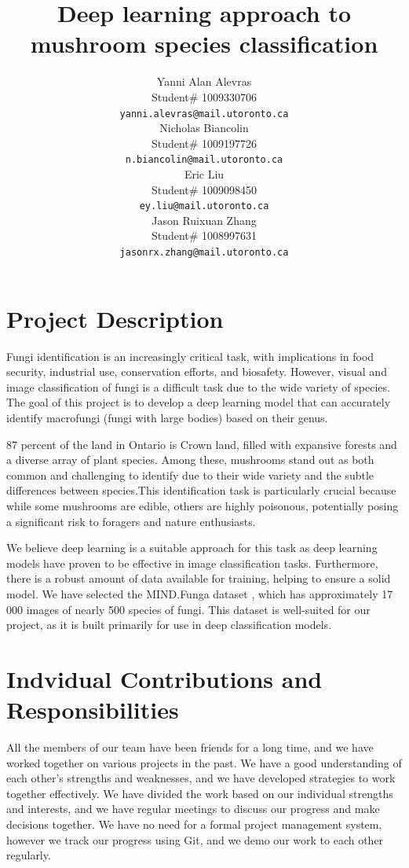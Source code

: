\documentclass{article} %
\title{Deep learning approach to  \\ 
mushroom species classification}
\author{Yanni Alan Alevras  \\
Student\# 1009330706 \\
\texttt{yanni.alevras@mail.utoronto.ca} \\
\And
Nicholas Biancolin  \\
Student\# 1009197726 \\
\texttt{n.biancolin@mail.utoronto.ca} \\
\AND
Eric Liu  \\
Student\# 1009098450 \\
\texttt{ey.liu@mail.utoronto.ca} \\
\And
Jason Ruixuan Zhang \\
Student\# 1008997631 \\
\texttt{jasonrx.zhang@mail.utoronto.ca} \\
\AND
}
\begin{document}
\maketitle

\section{Project Description}
\label{sec:project_description}

Fungi identification is an increasingly critical task, with implications in food security, industrial use, conservation efforts, and biosafety. However, visual and image classification of fungi is a difficult task due to the wide variety of species. The goal of this project is to develop a deep learning model that can accurately identify macrofungi (fungi with large bodies) based on their genus. 

87 percent of the land in Ontario is Crown land, filled with expansive forests and a diverse array of plant species. Among these, mushrooms stand out as both common and challenging to identify due to their wide variety and the subtle differences between species.This identification task is particularly crucial because while some mushrooms are edible, others are highly poisonous, potentially posing a significant risk to foragers and nature enthusiasts.

We believe deep learning is a suitable approach for this task as deep learning models have proven to be effective in image classification tasks. Furthermore, there is a robust amount of data available for training, helping to ensure a solid model. We have selected the MIND.Funga dataset \citep{Drechsler-SantosKarstedtEtAl.MINDFunga.2023}, which has approximately 17 000 images of nearly 500 species of fungi. This dataset is well-suited for our project, as it is built primarily for use in deep classification models.


\section{Indvidual Contributions and Responsibilities}
\label{sec:individual_contributions_and_responsibilities}

All the members of our team have been friends for a long time, and we have worked together on various projects in the past. We have a good understanding of each other's strengths and weaknesses, and we have developed strategies to work together effectively. We have divided the work based on our individual strengths and interests, and we have regular meetings to discuss our progress and make decisions together. We have no need for a formal project management system, however we track our progress using Git, and we demo our work to each other regularly.
\end{document}
